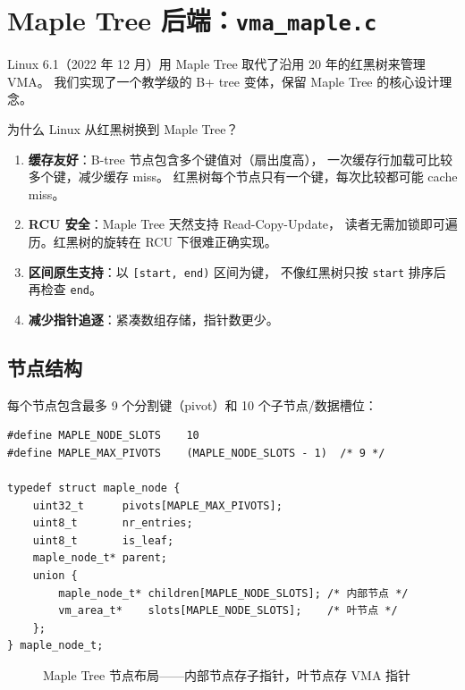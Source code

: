 \section{Maple Tree 后端：\texttt{vma\_maple.c}}
\label{sec:vma-maple}

Linux 6.1（2022 年 12 月）用 Maple Tree 取代了沿用 20 年的红黑树来管理 VMA。
我们实现了一个教学级的 B+ tree 变体，保留 Maple Tree 的核心设计理念。

\begin{whybox}
为什么 Linux 从红黑树换到 Maple Tree？

\begin{enumerate}
  \item \textbf{缓存友好}：B-tree 节点包含多个键值对（扇出度高），
        一次缓存行加载可比较多个键，减少缓存 miss。
        红黑树每个节点只有一个键，每次比较都可能 cache miss。
  \item \textbf{RCU 安全}：Maple Tree 天然支持 Read-Copy-Update，
        读者无需加锁即可遍历。红黑树的旋转在 RCU 下很难正确实现。
  \item \textbf{区间原生支持}：以 \texttt{[start, end)} 区间为键，
        不像红黑树只按 \texttt{start} 排序后再检查 \texttt{end}。
  \item \textbf{减少指针追逐}：紧凑数组存储，指针数更少。
\end{enumerate}
\end{whybox}

\subsection{节点结构}

每个节点包含最多 9 个分割键（pivot）和 10 个子节点/数据槽位：

\begin{lstlisting}[style=cstyle]
#define MAPLE_NODE_SLOTS    10
#define MAPLE_MAX_PIVOTS    (MAPLE_NODE_SLOTS - 1)  /* 9 */

typedef struct maple_node {
    uint32_t      pivots[MAPLE_MAX_PIVOTS];
    uint8_t       nr_entries;
    uint8_t       is_leaf;
    maple_node_t* parent;
    union {
        maple_node_t* children[MAPLE_NODE_SLOTS]; /* 内部节点 */
        vm_area_t*    slots[MAPLE_NODE_SLOTS];    /* 叶节点 */
    };
} maple_node_t;
\end{lstlisting}

\begin{figure}[H]
  \centering
  
  \caption{Maple Tree 节点布局——内部节点存子指针，叶节点存 VMA 指针}
  \label{fig:maple-node}
\end{figure}

